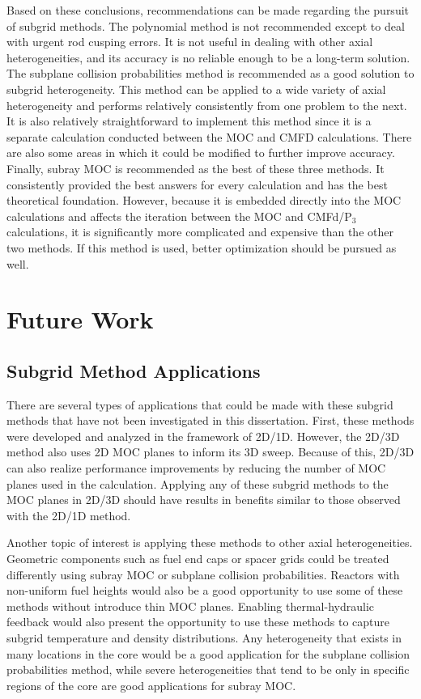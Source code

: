 Based on these conclusions, recommendations can be made regarding the pursuit of subgrid methods.  The polynomial method is not recommended except to deal with urgent rod cusping errors.  It is not useful in dealing with other axial heterogeneities, and its accuracy is no reliable enough to be a long-term solution.  The subplane collision probabilities method is recommended as a good solution to subgrid heterogeneity.  This method can be applied to a wide variety of axial heterogeneity and performs relatively consistently from one problem to the next.  It is also relatively straightforward to implement this method since it is a separate calculation conducted between the MOC and CMFD calculations.  There are also some areas in which it could be modified to further improve accuracy.  Finally, subray MOC is recommended as the best of these three methods.  It consistently provided the best answers for every calculation and has the best theoretical foundation.  However, because it is embedded directly into the MOC calculations and affects the iteration between the MOC and CMFd/P$_3$ calculations, it is significantly more complicated and expensive than the other two methods.  If this method is used, better optimization should be pursued as well.

\section{Future Work}

\subsection{Subgrid Method Applications}

There are several types of applications that could be made with these subgrid methods that have not been investigated in this dissertation. First, these methods were developed and analyzed in the framework of 2D/1D.  However, the 2D/3D method also uses 2D MOC planes to inform its 3D sweep.  Because of this, 2D/3D can also realize performance improvements by reducing the number of MOC planes used in the calculation.  Applying any of these subgrid methods to the MOC planes in 2D/3D should have results in benefits similar to those observed with the 2D/1D method.

Another topic of interest is applying these methods to other axial heterogeneities.  Geometric components such as fuel end caps or spacer grids could be treated differently using subray MOC or subplane collision probabilities.  Reactors with non-uniform fuel heights would also be a good opportunity to use some of these methods without introduce thin MOC planes.  Enabling thermal-hydraulic feedback would also present the opportunity to use these methods to capture subgrid temperature and density distributions.  Any heterogeneity that exists in many locations in the core would be a good application for the subplane collision probabilities method, while severe heterogeneities that tend to be only in specific regions of the core are good applications for subray MOC.

